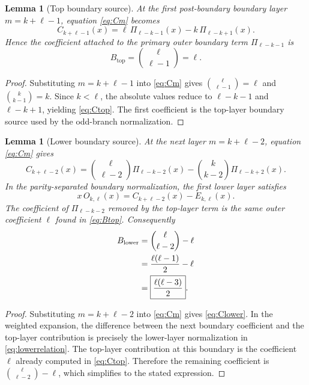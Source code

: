 \documentclass[11pt]{article}
\newtheorem{lemma}[theorem]{Lemma}
\theoremstyle{remark}
\theoremstyle{definition}
\newcommand{\Btop}{B_{\mathrm{top}}}
\newcommand{\Blower}{B_{\mathrm{lower}}}
\begin{document}
\begin{lemma}[Top boundary source]
At the first post-boundary boundary layer $m=k+\ell-1$, equation
\eqref{eq:Cm} becomes
\begin{equation}
C_{k+\ell-1}(x)
=\ell\,\Pi_{\ell-k-1}(x)-k\,\Pi_{\ell-k+1}(x).
\label{eq:Ctop}
\end{equation}
Hence the coefficient attached to the primary outer boundary term
$\Pi_{\ell-k-1}$ is
\begin{equation}
\boxed{\Btop=\binom{\ell}{\ell-1}=\ell.}
\label{eq:Btop}
\end{equation}
\end{lemma}

\begin{proof}
Substituting $m=k+\ell-1$ into \eqref{eq:Cm} gives
$\binom{\ell}{\ell-1}=\ell$ and
$\binom{k}{k-1}=k$. Since $k<\ell$, the absolute values reduce to
$\ell-k-1$ and $\ell-k+1$, yielding \eqref{eq:Ctop}. The first coefficient is
the top-layer boundary source used by the odd-branch normalization.
\end{proof}

\begin{lemma}[Lower boundary source]
At the next layer $m=k+\ell-2$, equation \eqref{eq:Cm} gives
\begin{equation}
C_{k+\ell-2}(x)
=\binom{\ell}{\ell-2}\Pi_{\ell-k-2}(x)
-\binom{k}{k-2}\Pi_{\ell-k+2}(x).
\label{eq:Clower}
\end{equation}
In the parity-separated boundary normalization, the first lower layer satisfies
\begin{equation}
x\,O_{k,\ell}(x)=C_{k+\ell-2}(x)-E_{k,\ell}(x).
\label{eq:lowerrelation}
\end{equation}
The coefficient of $\Pi_{\ell-k-2}$ removed by the top-layer term is the same
outer coefficient $\ell$ found in \eqref{eq:Btop}. Consequently
\begin{align}
\Blower
&=\binom{\ell}{\ell-2}-\ell\notag\\
&=\frac{\ell(\ell-1)}2-\ell\notag\\
&=\boxed{\frac{\ell(\ell-3)}2}.
\label{eq:Blower}
\end{align}
\end{lemma}

\begin{proof}
Substituting $m=k+\ell-2$ into \eqref{eq:Cm} gives \eqref{eq:Clower}. In the
weighted expansion, the difference between the next boundary coefficient and
the top-layer contribution is precisely the lower-layer normalization in
\eqref{eq:lowerrelation}. The top-layer contribution at this boundary is the
coefficient $\ell$ already computed in \eqref{eq:Ctop}. Therefore the remaining
coefficient is
$\binom{\ell}{\ell-2}-\ell$, which simplifies to the stated expression.
\end{proof}
\end{document}
